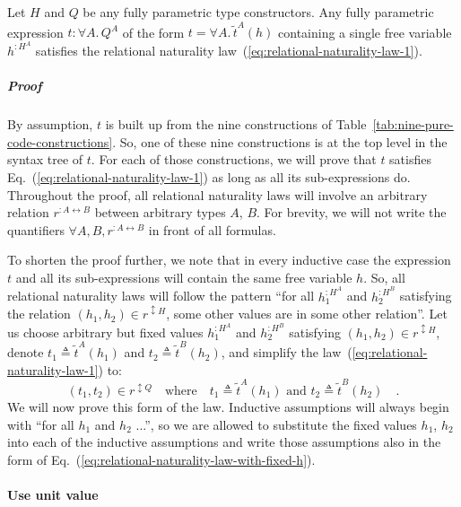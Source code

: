Let $H$ and $Q$ be any fully parametric type constructors. Any fully
parametric expression $t:\forall A.\,Q^{A}$ of the form $t=\forall A.\,\tilde{t}^{A}(h)$
containing a single free variable $h^{:H^{A}}$ satisfies the relational
naturality law~(\ref{eq:relational-naturality-law-1}).

\subparagraph{Proof }

By assumption, $t$ is built up from the nine constructions of Table~\ref{tab:nine-pure-code-constructions}.
So, one of these nine constructions is at the top level in the syntax
tree of $t$. For each of those constructions, we will prove that
$t$ satisfies Eq.~(\ref{eq:relational-naturality-law-1}) as long
as all its sub-expressions do. Throughout the proof, all relational
naturality laws will involve an arbitrary relation $r^{:A\leftrightarrow B}$
between arbitrary types $A$, $B$. For brevity, we will not write
the quantifiers $\forall A,B,r^{:A\leftrightarrow B}$ in front of
all formulas.

To shorten the proof further, we note that in every inductive case
the expression $t$ and all its sub-expressions will contain the same
free variable $h$. So, all relational naturality laws will follow
the pattern \textsf{``}for all $h_{1}^{:H^{A}}$ and $h_{2}^{:H^{B}}$ satisfying
the relation $(h_{1},h_{2})\in r^{\updownarrow H}$, some other values
are in some other relation\textsf{''}. Let us choose arbitrary but fixed values
$h_{1}^{:H^{A}}$ and $h_{2}^{:H^{B}}$ satisfying $(h_{1},h_{2})\in r^{\updownarrow H}$,
denote $t_{1}\triangleq\tilde{t}^{A}(h_{1})$ and $t_{2}\triangleq\tilde{t}^{B}(h_{2})$,
and simplify the law~(\ref{eq:relational-naturality-law-1}) to:
\begin{equation}
(t_{1},t_{2})\in r^{\updownarrow Q}\quad\text{where}\quad t_{1}\triangleq\tilde{t}^{A}(h_{1})\text{ and }t_{2}\triangleq\tilde{t}^{B}(h_{2})\quad.\label{eq:relational-naturality-law-with-fixed-h}
\end{equation}
We will now prove this form of the law. Inductive assumptions will
always begin with \textsf{``}for all $h_{1}$ and $h_{2}$ ...\textsf{''}, so we are
allowed to substitute the fixed values $h_{1}$, $h_{2}$ into each
of the inductive assumptions and write those assumptions also in the
form of Eq.~(\ref{eq:relational-naturality-law-with-fixed-h}).

\paragraph{Use unit value}

